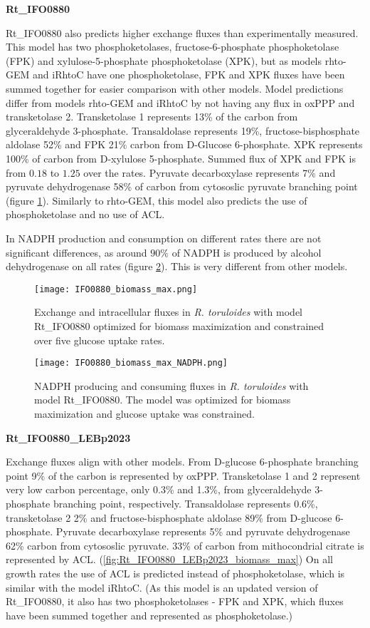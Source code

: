 \textbf{Rt\_IFO0880}

Rt\_IFO0880 also predicts higher exchange fluxes than experimentally measured. 
This model has two phosphoketolases, fructose-6-phosphate phosphoketolase (FPK) and xylulose-5-phosphate phosphoketolase (XPK), 
but as models rhto-GEM and iRhtoC
have one phosphoketolase, FPK and XPK fluxes have been summed together for easier comparison with other models.
Model predictions differ from models rhto-GEM and iRhtoC by not having any flux in oxPPP and transketolase 2.
Transketolase 1 represents 13\% of the carbon from glyceraldehyde 3-phosphate. Transaldolase represents 19\%, fructose-bisphosphate 
aldolase 52\% and FPK 21\% carbon from D-Glucose 6-phosphate. 
XPK represents 100\% of carbon from D-xylulose 5-phosphate. Summed flux of XPK and FPK is from $0.18$ to $1.25$ over the rates.
Pyruvate decarboxylase represents 7\% and pyruvate 
dehydrogenase 58\% of carbon from cytososlic pyruvate branching point (figure \ref{fig:IFO0880_biomass_max}).
Similarly to rhto-GEM, this model also predicts the use of phosphoketolase and no use of ACL. 

In NADPH production and consumption on different rates there are not significant differences, as
around $90\%$ of NADPH is produced by alcohol dehydrogenase on all rates (figure \ref{fig:IFO0880_biomass_max_NADPH_max}). 
This is very different from other models.
\begin{figure}[H]
    \centering
    \texttt{[image: IFO0880\_biomass\_max.png]}
    \caption{Exchange and intracellular fluxes in \textit{R. toruloides} with model Rt\_IFO0880 optimized for biomass maximization 
    and constrained over five glucose uptake rates.}
    \label{fig:IFO0880_biomass_max}
\end{figure}
\begin{figure}[H]
    \centering
    \texttt{[image: IFO0880\_biomass\_max\_NADPH.png]}
    \caption{NADPH producing and consuming fluxes in \textit{R. toruloides} with model Rt\_IFO0880. The model was optimized for biomass maximization 
    and glucose uptake was constrained.}
    \label{fig:IFO0880_biomass_max_NADPH_max}
\end{figure}



\textbf{Rt\_IFO0880\_LEBp2023}

Exchange fluxes align with other models. From D-glucose 6-phosphate branching point 9\% of the carbon is represented by oxPPP. 
Transketolase 1 and 2 represent very
low carbon percentage, only 0.3\% and 1.3\%, from glyceraldehyde 3-phosphate branching point, respectively. Transaldolase represents
0.6\%, transketolase 2 2\% and fructose-bisphosphate aldolase 89\% from D-glucose 6-phosphate. Pyruvate decarboxylase represents 5\% 
and pyruvate dehydrogenase 62\% carbon from cytososlic pyruvate. %
33\% of carbon from mithocondrial citrate is represented by ACL. (\ref{fig:Rt_IFO0880_LEBp2023_biomass_max})
On all growth rates the use of ACL is predicted instead of phosphoketolase, which is similar with the model iRhtoC. 
(As this model is an updated version of Rt\_IFO0880, it also has two phosphoketolases - FPK and XPK, which fluxes
have been summed together and represented as phosphoketolase.) 

